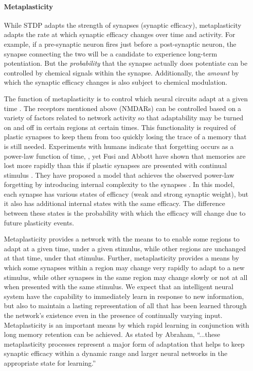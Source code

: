 \paragraph{Metaplasticity}
While STDP adapts the strength of synapses (synaptic efficacy), metaplasticity adapts the rate at which synaptic efficacy changes over time and activity. For example, if a pre-synaptic neuron fires just before a post-synaptic neuron, the synapse connecting the two will be a candidate to experience long-term potentiation. But the \textit{probability} that the synapse actually does potentiate can be controlled by chemical signals within the synapse. Additionally, the \textit{amount} by which the synaptic efficacy changes is also subject to chemical modulation. 

The function of metaplasticity is to control which neural circuits adapt at a given time \cite{ab2008}. The receptors mentioned above (NMDARs) can be controlled based on a variety of factors related to network activity so that adaptability may be turned on and off in certain regions at certain times. This functionality is required of plastic synapses to keep them from too quickly losing the trace of a memory that is still needed. Experiments with humans indicate that forgetting occurs as a power-law function of time, \cite{wieb1991,wieb1997}, yet Fusi and Abbott have shown that memories are lost more rapidly than this if plastic synapses are presented with continual stimulus \cite{fuab2007}. They have proposed a model that achieves the observed power-law forgetting by introducing internal complexity to the synapses \cite{fudr2005}. In this model, each synapse has various states of efficacy (weak and strong synaptic weight), but it also has additional internal states with the same efficacy. The difference between these states is the probability with which the efficacy will change due to future plasticity events. 

Metaplasticity provides a network with the means to to enable some regions to adapt at a given time, under a given stimulus, while other regions are unchanged at that time, under that stimulus. Further, metaplasticity provides a means by which some synapses within a region may change very rapidly to adapt to a new stimulus, while other synapses in the same region may change slowly or not at all when presented with the same stimulus. We expect that an intelligent neural system have the capability to immediately learn in response to new information, but also to maintain a lasting representation of all that has been learned through the network's existence even in the presence of continually varying input. Metaplasticity is an important means by which rapid learning in conjunction with long memory retention can be achieved. As stated by Abraham, ``...these metaplasticity processes represent a major form of adaptation that helps to keep synaptic efficacy within a dynamic range and larger neural networks in the appropriate state for learning.''

